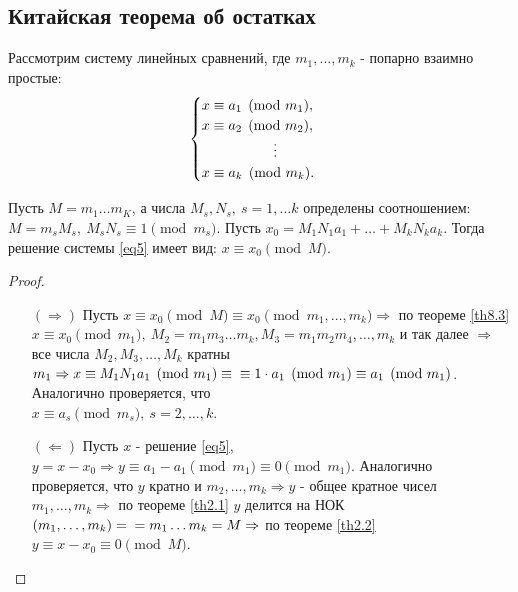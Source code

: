     \subsection*{Китайская теорема об остатках}
    Рассмотрим систему линейных сравнений, где $m_1,\dots, m_k$ - попарно взаимно простые:
    \begin{equation}
        \begin{cases} \label{eq5}
            x\equiv a_1 \pmod{m_1},\\
            x\equiv a_2 \pmod{m_2},\\
            \tab[1.8cm] \vdots\\
            x\equiv a_k \pmod{m_k}.
        \end{cases}
    \end{equation}
    \begin{theorem}\label{th9.2}
        Пусть $M=m_1 \dots m_K$, а числа $M_s, N_s,\ s=1, \dots k$ определены соотношением: $M=m_s M_s,\ M_s N_s\equiv 1 \pmod{m_s}$. Пусть $x_0=M_1 N_1 a_1+ \dots + M_k N_k a_k$. Тогда решение системы \eqref{eq5} имеет вид: $x\equiv x_0 \pmod{M}$.
    \end{theorem} 
    \begin{proof}\tab
        \begin{itemize}
            \item[$(\Rightarrow)$] Пусть $x\equiv x_0 \pmod{M}\equiv x_0\pmod{m_1, \dots, m_k} \Rightarrow$ по теореме \ref{th8.3}\\
            $x\equiv x_0 \pmod{m_1},\ M_2=m_1 m_3 \dots m_k, M_3=m_1 m_2 m_4, \dots, m_k$ и так далее $\Rightarrow$ все числа $M_2, M_3, \dots, M_k$ кратны $m_1 \Rightarrow x\equiv M_1 N_1 a_1 \pmod{m_1}\equiv\\ \equiv 1\cdot a_1 \pmod{m_1}\equiv a_1 \pmod{m_1}$. Аналогично проверяется, что \\
            $x\equiv a_s \pmod{m_s},\ s=2, \dots, k$.
            \item[$(\Leftarrow)$] Пусть $x$ - решение \eqref{eq5}, $y=x-x_0 \Rightarrow y\equiv a_1-a_1 \pmod{m_1}\equiv 0\pmod{m_1}$. Аналогично проверяется, что $y$ кратно и $m_2, \dots, m_k \Rightarrow y$ - общее кратное чисел $m_1, \dots, m_k \Rightarrow$ по теореме \ref{th2.1} $y$ делится на НОК$(m_1, \dots, m_k)=\\=m_1 \dots m_k=M \Rightarrow$ по теореме \ref{th2.2} $y\equiv x-x_0\equiv 0\pmod{M}$.
        \end{itemize}
    \end{proof} 
